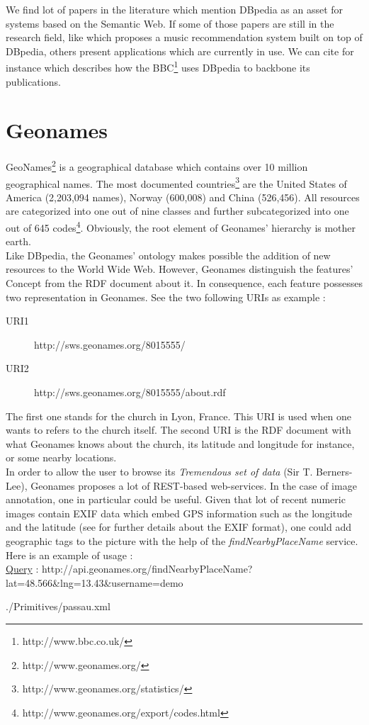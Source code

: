 We find lot of papers in the literature which mention DBpedia as an asset for systems based on the Semantic Web. If some of those papers are still in the research field, like \cite{passant2010dbrec} which proposes a music recommendation system built on top of DBpedia, others present  applications which are currently in use. We can cite for instance \cite{kobilarov2009media} which describes how the BBC\footnote{http://www.bbc.co.uk/} uses DBpedia to backbone its publications. 

\section{Geonames} %
\label{sec:geonames}

GeoNames\footnote{http://www.geonames.org/} is a geographical database which contains over 10 million geographical names. The most documented countries\footnote{http://www.geonames.org/statistics/} are the United States of America (2,203,094 names), Norway (600,008) and China (526,456). All resources are categorized into one out of nine classes and further subcategorized into one out of 645 codes\footnote{http://www.geonames.org/export/codes.html}. Obviously, the root element of Geonames' hierarchy is mother earth.\\

Like DBpedia, the Geonames' ontology makes possible the addition of new resources to the World Wide Web. However, Geonames distinguish the features' Concept from the RDF document about it. In consequence, each feature possesses two representation in Geonames. See the two following URIs as example :
\begin{description}
\item[URI1] http://sws.geonames.org/8015555/
\item[URI2] http://sws.geonames.org/8015555/about.rdf
\end{description}
The first one stands for the  church in Lyon, France. This URI is used when one wants to refers to the church itself. The second URI is the RDF document with what Geonames knows about the church, its latitude and longitude for instance, or some nearby locations.\\

In order to allow the user to browse its \emph{Tremendous set of data} (Sir T. Berners-Lee), Geonames proposes a lot of REST-based web-services. In the case of image annotation, one in particular could be useful. Given that lot of recent numeric images contain EXIF data which embed GPS information such as the longitude and the latitude (see \cite{tevsic2005metadata} for further details about the EXIF format), one could add geographic tags to the picture with the help of the \textit{findNearbyPlaceName} service. Here is an example of usage :\\
\underline{Query} : http://api.geonames.org/findNearbyPlaceName?lat=48.566\&lng=13.43\&username=demo 

	{./Primitives/passau.xml}

